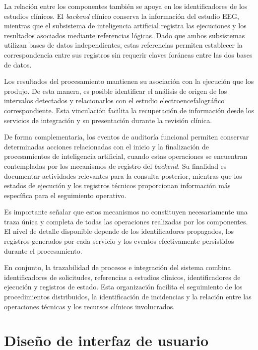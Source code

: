 La relación entre los componentes también se apoya
en los identificadores de los estudios clínicos.
El \textit{backend} clínico conserva la información del
estudio EEG, mientras que el subsistema de inteligencia
artificial registra las ejecuciones y los resultados
asociados mediante referencias lógicas. Dado que
ambos subsistemas utilizan bases de datos independientes,
estas referencias permiten establecer la correspondencia
entre sus registros sin requerir claves foráneas
entre las dos bases de datos.

Los resultados del procesamiento mantienen su
asociación con la ejecución que los produjo. De esta
manera, es posible identificar el análisis de origen
de los intervalos detectados y relacionarlos con el
estudio electroencefalográfico correspondiente. Esta
vinculación facilita la recuperación de información
desde los servicios de integración y su presentación
durante la revisión clínica.

De forma complementaria, los eventos de auditoría
funcional permiten conservar determinadas acciones
relacionadas con el inicio y la finalización de
procesamientos de inteligencia artificial, cuando
estas operaciones se encuentran contempladas por
los mecanismos de registro del \textit{backend}. Su finalidad
es documentar actividades relevantes para la consulta
posterior, mientras que los estados de ejecución y
los registros técnicos proporcionan información
más específica para el seguimiento operativo.

Es importante señalar que estos mecanismos no
constituyen necesariamente una traza única y completa
de todas las operaciones realizadas por los componentes.
El nivel de detalle disponible depende de los
identificadores propagados, los registros generados
por cada servicio y los eventos efectivamente
persistidos durante el procesamiento.

En conjunto, la trazabilidad de procesos e integración
del sistema combina identificadores de solicitudes,
referencias a estudios clínicos, identificadores de
ejecución y registros de estado. Esta organización
facilita el seguimiento de los procedimientos
distribuidos, la identificación de incidencias y
la relación entre las operaciones técnicas y los
recursos clínicos involucrados.


\section{Diseño de interfaz de usuario}
\label{sec:diseno-interfaz-usuario}

